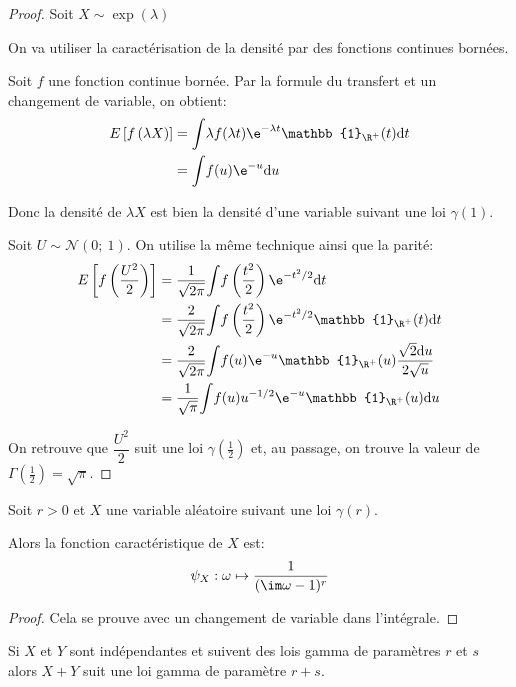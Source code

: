 \begin{proof}
Soit $X \sim \exp(\lambda)$

On va utiliser la caractérisation de la densité par des fonctions continues bornées.

Soit $f$ une fonction continue bornée. Par la formule du transfert et un changement de variable, on obtient:
\begin{align*}
E\left[f\left(\lambda X\right)\right] & = \displaystyle{\int} \lambda f(\lambda t) \e^{-\lambda t} \mathbb{1}_{\R^+}(t) \mathrm d t \\
 & = \displaystyle{\displaystyle{\int}} f(u) \e^{-u} \mathrm d u
\end{align*}

Donc la densité de $\lambda X$ est bien la densité d'une variable suivant une loi $\gamma(1)$.

Soit $U \sim \mathcal{N}(0;~1)$. On utilise la même technique ainsi que la parité:
\begin{align*}
E\left[f\left(\dfrac{U^2}{2}\right)\right] & = \dfrac{1}{\sqrt{2 \pi}}\displaystyle{\int} f\left(\dfrac{t^2}{2}\right) \e^{-t^2/2} \mathrm d t \\
& = \dfrac{2}{\sqrt{2 \pi}}\displaystyle{\int} f\left(\dfrac{t^2}{2}\right) \e^{-t^2/2} \mathbb{1}_{\R^+}(t) \mathrm d t \\
& = \dfrac{2}{\sqrt{2 \pi}}\displaystyle{\int} f(u) \e^{-u} \mathbb{1}_{\R^+}(u) \dfrac{\sqrt{2}\mathrm d u}{2\sqrt{u}} \\
& = \dfrac{1}{\sqrt{\pi}}\displaystyle{\int} f(u) u^{-1/2}\e^{-u} \mathbb{1}_{\R^+}(u) \mathrm d u
\end{align*}

On retrouve que $\dfrac{U^2}{2}$ suit une loi $\gamma\left(\frac{1}{2}\right)$ et, au passage, on trouve la valeur de $\Gamma\left(\frac{1}{2}\right) = \sqrt{\pi}$.
\end{proof}


\begin{prop}
Soit $r>0$ et $X$ une variable aléatoire suivant une loi $\gamma(r)$.

Alors la fonction caractéristique de $X$ est:
\[
\psi_X: \omega \mapsto \dfrac{1}{(\im\omega -1)^r}
\]
\end{prop}

\begin{proof}
Cela se prouve avec un changement de variable dans l'intégrale.
\end{proof}


\begin{prop}
Si $X$ et $Y$ sont indépendantes et suivent des lois gamma de paramètres $r$ et $s$ alors $X+Y$ suit une loi gamma de paramètre $r+s$.
\end{prop}


